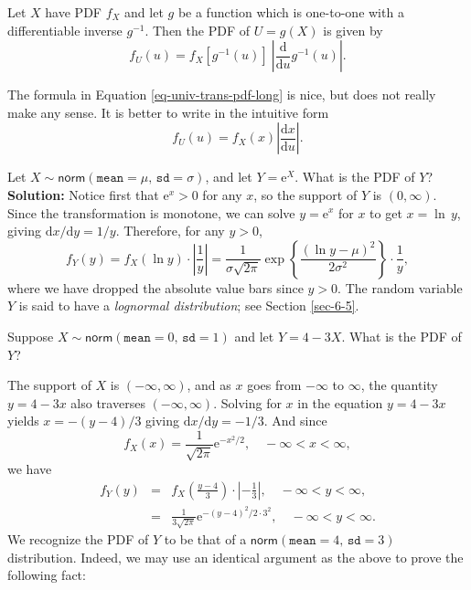 \documentclass[captions=tableheading]{scrbook}
\begin{document}
\begin{prop}

Let \(X\) have PDF \(f_{X}\) and let \(g\) be a function which is one-to-one with a differentiable inverse \(g^{-1}\). Then the PDF of \(U=g(X)\) is given by
\begin{equation}
f_{U}(u)=f_{X}\left[g^{-1}(u)\right]\ \left|\frac{\mathrm{d}}{\mathrm{d} u}g^{-1}(u)\right|.\label{eq-univ-trans-pdf-long}
\end{equation}
\end{prop}

\begin{rem}
The formula in Equation \ref{eq-univ-trans-pdf-long} is nice, but does not really make any sense. It is better to write in the intuitive form
\begin{equation}
f_{U}(u)=f_{X}(x)\left|\frac{\mathrm{d} x}{\mathrm{d} u}\right|.\label{eq-univ-trans-pdf-short}
\end{equation}
\end{rem}

\begin{example}
Let \(X\sim\mathsf{norm}(\mathtt{mean}=\mu,\,\mathtt{sd}=\sigma)\), and let \(Y=\mathrm{e}^{X}\). What is the PDF of \(Y\)? 
\textbf{Solution:} Notice first that \(\mathrm{e}^{x}>0\) for any \(x\), so the support of \(Y\) is \((0,\infty)\). Since the transformation is monotone, we can solve \(y=\mathrm{e}^{x}\) for \(x\) to get \(x=\ln\, y\), giving \(\mathrm{d} x/\mathrm{d} y=1/y\). Therefore, for any \(y>0\),
\[
f_{Y}(y)=f_{X}(\ln y)\cdot\left|\frac{1}{y}\right|=\frac{1}{\sigma\sqrt{2\pi}}\exp\left\{ \frac{(\ln y-\mu)^{2}}{2\sigma^{2}}\right\} \cdot\frac{1}{y},
\]
where we have dropped the absolute value bars since \(y>0\). The random variable \(Y\) is said to have a \emph{lognormal distribution}; see Section \ref{sec-6-5}.
\end{example}

\begin{example}
Suppose \(X\sim\mathsf{norm}(\mathtt{mean}=0,\,\mathtt{sd}=1)\) and let \(Y=4-3X\). What is the PDF of \(Y\)?
\end{example}

The support of \(X\) is \((-\infty,\infty)\), and as \(x\) goes from \(-\infty\) to \(\infty\), the quantity \(y=4-3x\) also traverses \((-\infty,\infty)\). Solving for \(x\) in the equation \(y=4-3x\) yields \(x=-(y-4)/3\) giving \(\mathrm{d} x/\mathrm{d} y=-1/3\). And since
\[
f_{X}(x)=\frac{1}{\sqrt{2\pi}}\mathrm{e}^{-x^{2}/2}, \quad -\infty < x < \infty ,
\]
we have
\begin{eqnarray*}
f_{Y}(y) & = & f_{X}\left(\frac{y-4}{3}\right)\cdot\left|-\frac{1}{3}\right|,\quad-\infty<y<\infty,\\
 & = & \frac{1}{3\sqrt{2\pi}}\mathrm{e}^{-(y-4)^{2}/2\cdot3^{2}},\quad-\infty<y<\infty.
\end{eqnarray*}
We recognize the PDF of \(Y\) to be that of a \(\mathsf{norm}(\mathtt{mean}=4,\,\mathtt{sd}=3)\) distribution. Indeed, we may use an identical argument as the above to prove the following fact:
\end{document}
